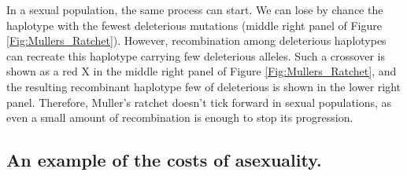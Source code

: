 In a sexual population, the same process can start. We can lose by chance the haplotype with the fewest deleterious mutations (middle right panel of Figure \ref{Fig:Mullers_Ratchet}). However, recombination among deleterious haplotypes can recreate this haplotype carrying few deleterious alleles. Such a crossover is shown as a red X in the middle right panel of  Figure \ref{Fig:Mullers_Ratchet}, and the resulting recombinant haplotype few of deleterious is shown in the lower right panel. Therefore, Muller's ratchet doesn't tick forward in sexual populations, as even a small amount of recombination is enough to stop its progression.  
\subsection{An example of the costs of asexuality.}

